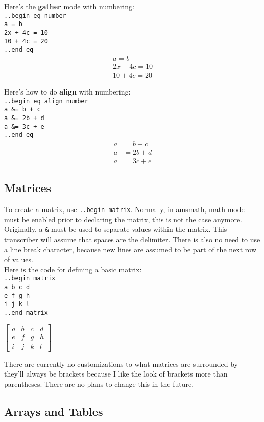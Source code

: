 \documentclass[12pt]{article}
\newcommand{\nl}{\\}
\renewcommand\bold{\textbf}
\begin{document}
\begin{flushleft}
\medskip

Here's the \bold{gather} mode with numbering: \nl
\verb|..begin eq number|\nl
\verb|a = b|\nl
\verb|2x + 4c = 10|\nl
\verb|10 + 4c = 20|\nl
\verb|..end eq|
\begin{gather}
a = b \\
2x + 4c = 10 \\
10 + 4c = 20 
\end{gather}

\medskip

Here's how to do \bold{align} with numbering: \nl
\verb|..begin eq align number|\nl
\verb|a &= b + c|\nl
\verb|a &= 2b + d|\nl
\verb|a &= 3c + e|\nl
\verb|..end eq|
\begin{align}
a &= b + c \\
a &= 2b + d \\
a &= 3c + e 
\end{align}

\newpage

\subsection*{Matrices}

To create a matrix, use \verb|..begin matrix|. Normally, in amsmath, math mode must be enabled prior to declaring the matrix, this is not the case anymore. \nl
Originally, a \verb|&| must be used to separate values within the matrix. This transcriber will assume that spaces are the delimiter. There is also no need to use a line break character, because new lines are assumed to be part of the next row of values. \nl
Here is the code for defining a basic matrix: \nl
\verb|..begin matrix|\nl
\verb|a b c d|\nl
\verb|e f g h|\nl
\verb|i j k l|\nl
\verb|..end matrix|

\medskip

$\begin{bmatrix}
a & b & c & d \\
e & f & g & h \\
i & j & k & l 
\end{bmatrix}$

\medskip

There are currently no customizations to what matrices are surrounded by -- they'll always be brackets because I like the look of brackets more than parentheses. There are no plans to change this in the future.

\newpage

\subsection*{Arrays and Tables}


\end{flushleft}
\end{document}
